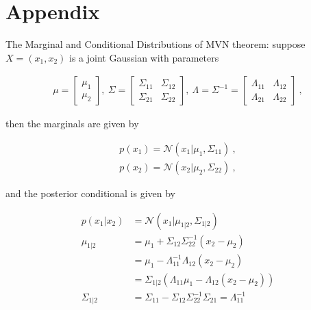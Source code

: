 \documentclass[preprint,12pt]{elsarticle}
\begin{document}
\appendix
\section{Appendix}
\label{APPENDIX}

The Marginal and Conditional Distributions of MVN theorem: suppose $X=({x}_1,{x}_2)$ is a joint Gaussian with parameters
\begin{ceqn}
    \begin{align}
        {\mu}=\begin{bmatrix}{\mu}_1 \\ {\mu}_2\end{bmatrix} , \ 
        {\Sigma}=\begin{bmatrix} {\Sigma}_{11} & {\Sigma}_{12} \\ {\Sigma}_{21} & {\Sigma}_{22} \end{bmatrix} , \ 
        {\Lambda}={\Sigma}^{-1}=\begin{bmatrix} {\Lambda}_{11} & {\Lambda}_{12} \\ {\Lambda}_{21} & {\Lambda}_{22} \end{bmatrix} \ , \nonumber
    \end{align}
\end{ceqn}
then the marginals are given by
\begin{ceqn}
    \begin{equation}
        \begin{split}
            p({x}_1)= \mathcal{N}({x}_1|{\mu}_1,{\Sigma}_{11}) \ , \\
            p({x}_2)= \mathcal{N}({x}_2|{\mu}_2,{\Sigma}_{22})  \ , \nonumber
        \end{split}
    \end{equation}
\end{ceqn}
and the posterior conditional is given by

\begin{ceqn}
   \begin{equation}\label{eqn:Marginals-and-conditionals-of-an-MVN}
       \begin{split}
        p({x}_1|{x}_2)& =\mathcal{N}({x}_1|{\mu}_{1|2},{\Sigma}_{1|2}) \\
        {\mu}_{1|2}& = {\mu}_1+{\Sigma}_{12}{\Sigma}_{22}^{-1}({x}_2-{\mu}_2) \\
    	               & = {\mu}_1-{\Lambda}_{11}^{-1}{\Lambda}_{12}({x}_2-{\mu}_2) \\
    				   & = {\Sigma}_{1|2}\left({\Lambda}_{11}{\mu}_1-{\Lambda}_{12}({x}_2-{\mu}_2)\right) \\
    	{\Sigma}_{1|2}& = {\Sigma}_{11}-{\Sigma}_{12}{\Sigma}_{22}^{-1}{\Sigma}_{21}={\Lambda}_{11}^{-1} \nonumber
       \end{split}
    \end{equation}
\end{ceqn}
\end{document}
